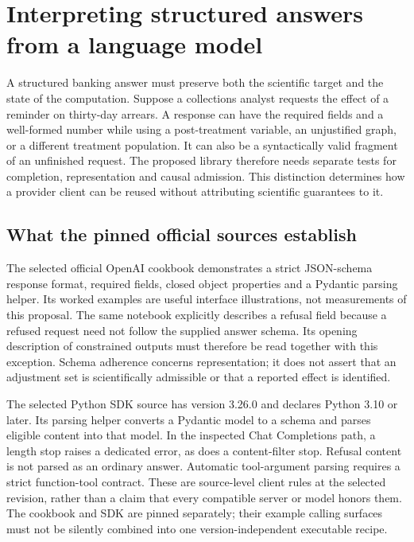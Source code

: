 \section[Structured outputs and scientific admission]{Interpreting structured answers from a language model}
\label{sec:exec28-oa}
A structured banking answer must preserve both the scientific target and the state of the computation.
Suppose a collections analyst requests the effect of a reminder on thirty-day arrears. A response can have
the required fields and a well-formed number while using a post-treatment variable, an unjustified graph,
or a different treatment population. It can also be a syntactically valid fragment of an unfinished request.
The proposed library therefore needs separate tests for completion, representation and causal admission.
This distinction determines how a provider client can be reused without attributing scientific guarantees to it.

\subsection{What the pinned official sources establish}
The selected official OpenAI cookbook demonstrates a strict JSON-schema response format, required fields,
closed object properties and a Pydantic parsing helper. Its worked examples are useful interface illustrations,
not measurements of this proposal. The same notebook explicitly describes a refusal field because a refused
request need not follow the supplied answer schema. Its opening description of constrained outputs must
therefore be read together with this exception. Schema adherence concerns representation; it does not assert
that an adjustment set is scientifically admissible or that a reported effect is identified.\citep{exec28_oa_cookbook}

The selected Python SDK source has version 3.26.0 and declares Python 3.10 or later. Its parsing helper converts
a Pydantic model to a schema and parses eligible content into that model. In the inspected Chat Completions path,
a length stop raises a dedicated error, as does a content-filter stop. Refusal content is not parsed as an ordinary
answer. Automatic tool-argument parsing requires a strict function-tool contract. These are source-level client
rules at the selected revision, rather than a claim that every compatible server or model honors them.
The cookbook and SDK are pinned separately; their example calling surfaces must not be silently combined into
one version-independent executable recipe.\citep{exec28_oa_sdk,exec28_oa_cookbook}

